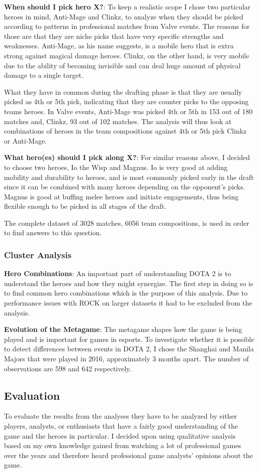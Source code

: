\documentclass[report.tex]{subfiles}
\begin{document}
\textbf{When should I pick hero X?}: To keep a realistic scope I chose two particular heroes in mind, Anti-Mage and Clinkz, to analyze when they should be picked according to patterns in professional matches from Valve events. The reasons for those are that they are niche picks that have very specific strengths and weaknesses. Anti-Mage, as his name suggests, is a mobile hero that is extra strong against magical damage heroes. Clinkz, on the other hand, is very mobile due to the ability of becoming invisible and can deal huge amount of physical damage to a single target.

What they have in common during the drafting phase is that they are usually picked as 4th or 5th pick, indicating that they are counter picks to the opposing teams heroes. In Valve events, Anti-Mage was picked 4th or 5th in 153 out of 180 matches and, Clinkz, 93 out of 102 matches. The analysis will thus look at combinations of heroes in the team compositions against 4th or 5th pick Clinkz or Anti-Mage.

\textbf{What hero(es) should I pick along X?}: For similar reasons above, I decided to choose two heroes, Io the Wisp and Magnus. Io is very good at adding mobility and durability to heroes, and is most commonly picked early in the draft since it can be combined with many heroes depending on the opponent's picks. Magnus is good at buffing melee heroes and initiate engagements, thus being flexible enough to be picked in all stages of the draft.

The complete dataset of 3028 matches, 6056 team compositions, is used in order to find answers to this question.

\subsubsection*{Cluster Analysis}

\textbf{Hero Combinations}: An important part of understanding DOTA 2 is to understand the heroes and how they might synergize. The first step in doing so is to find common hero combinations which is the purpose of this analysis. Due to performance issues with ROCK on larger datasets it had to be excluded from the analysis.

\textbf{Evolution of the Metagame}: The metagame shapes how the game is being played and is important for games in esports. To investigate whether it is possible to detect differences between events in DOTA 2, I chose the Shanghai and Manila Majors that were played in 2016, approximately 3 months apart. The number of observations are 598 and 642 respectively.

\subsection*{Evaluation}

To evaluate the results from the analyses they have to be analyzed by either players, analysts, or enthusiasts that have a fairly good understanding of the game and the heroes in particular. I decided upon using qualitative analysis based on my own knowledge gained from watching a lot of professional games over the years and therefore heard professional game analysts' opinions about the game.
\end{document}
